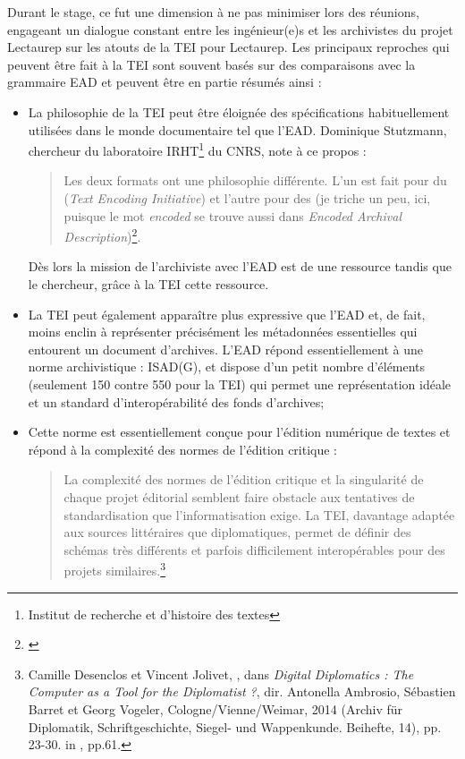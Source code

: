 Durant le stage, ce fut une dimension à ne pas minimiser lors des réunions,  engageant un dialogue constant entre les ingénieur(e)s et les archivistes du projet Lectaurep sur les atouts de la TEI pour Lectaurep. Les principaux reproches qui peuvent être fait à la TEI sont souvent basés sur des comparaisons avec la grammaire EAD et peuvent être en partie résumés ainsi :\\
\begin{itemize}
    \item La philosophie de la TEI peut être éloignée des spécifications habituellement utilisées dans le monde documentaire tel que l'EAD. Dominique Stutzmann, chercheur du laboratoire IRHT\footnote{Institut de recherche et d'histoire des textes} du CNRS, note à ce propos : 
    \begin{quote}
        Les deux formats ont une philosophie différente. L'un est fait pour  du  
        (\textit{Text Encoding Initiative}) et l'autre pour  des  (je triche un peu, ici, puisque le mot \textit{encoded} se trouve aussi dans \textit{Encoded Archival Description})\footnote{\cite{stutzmann_ead-tei_2019}}.
    \end{quote}
    Dès lors la mission de l'archiviste avec l'EAD est de  une ressource tandis que le chercheur, grâce à la TEI  cette ressource.\\
    \item La TEI peut également apparaître plus expressive que l'EAD et, de fait, moins enclin à représenter précisément les métadonnées essentielles qui entourent un document d'archives. L'EAD répond essentiellement à une norme archivistique : ISAD(G), et dispose d'un petit nombre d'éléments (seulement 150 contre 550 pour la TEI) qui permet une représentation idéale et un standard d'interopérabilité des fonds d'archives;\\
    \item Cette norme est essentiellement conçue pour l'édition numérique de textes et répond à la complexité des normes de l'édition critique : 
    \begin{quote}
        La  complexité  des  normes  de  l'édition  critique  et  la  singularité  de  chaque  projet éditorial semblent faire obstacle aux tentatives de standardisation que l'informatisation  exige. La  TEI,
        davantage  adaptée  aux  sources  littéraires  que diplomatiques, permet de définir des schémas très différents et parfois difficilement interopérables pour des projets similaires.\footnote{Camille  Desenclos  et  Vincent  Jolivet,  ,  dans  \textit{Digital  Diplomatics : The Computer as a Tool for the Diplomatist ?},  dir.  Antonella  Ambrosio,  Sébastien  Barret  et  Georg  Vogeler, Cologne/Vienne/Weimar, 2014 (Archiv für Diplomatik, Schriftgeschichte, Siegel- und Wappenkunde. Beihefte, 14), pp. 23-30. in \cite{canteaut_actes_2020}, pp.61.} 
    \end{quote} 
\end{itemize}
